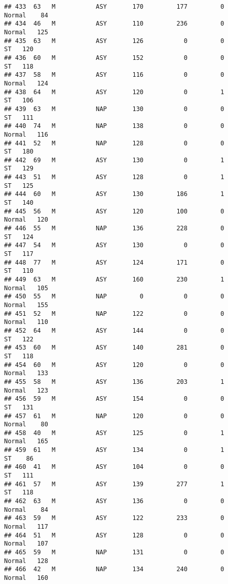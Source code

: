 \documentclass[
]{article}
\begin{document}
\begin{verbatim}
## 433  63   M           ASY       170         177         0     Normal    84
## 434  46   M           ASY       110         236         0     Normal   125
## 435  63   M           ASY       126           0         0         ST   120
## 436  60   M           ASY       152           0         0         ST   118
## 437  58   M           ASY       116           0         0     Normal   124
## 438  64   M           ASY       120           0         1         ST   106
## 439  63   M           NAP       130           0         0         ST   111
## 440  74   M           NAP       138           0         0     Normal   116
## 441  52   M           NAP       128           0         0         ST   180
## 442  69   M           ASY       130           0         1         ST   129
## 443  51   M           ASY       128           0         1         ST   125
## 444  60   M           ASY       130         186         1         ST   140
## 445  56   M           ASY       120         100         0     Normal   120
## 446  55   M           NAP       136         228         0         ST   124
## 447  54   M           ASY       130           0         0         ST   117
## 448  77   M           ASY       124         171         0         ST   110
## 449  63   M           ASY       160         230         1     Normal   105
## 450  55   M           NAP         0           0         0     Normal   155
## 451  52   M           NAP       122           0         0     Normal   110
## 452  64   M           ASY       144           0         0         ST   122
## 453  60   M           ASY       140         281         0         ST   118
## 454  60   M           ASY       120           0         0     Normal   133
## 455  58   M           ASY       136         203         1     Normal   123
## 456  59   M           ASY       154           0         0         ST   131
## 457  61   M           NAP       120           0         0     Normal    80
## 458  40   M           ASY       125           0         1     Normal   165
## 459  61   M           ASY       134           0         1         ST    86
## 460  41   M           ASY       104           0         0         ST   111
## 461  57   M           ASY       139         277         1         ST   118
## 462  63   M           ASY       136           0         0     Normal    84
## 463  59   M           ASY       122         233         0     Normal   117
## 464  51   M           ASY       128           0         0     Normal   107
## 465  59   M           NAP       131           0         0     Normal   128
## 466  42   M           NAP       134         240         0     Normal   160

\end{verbatim}
\end{document}
